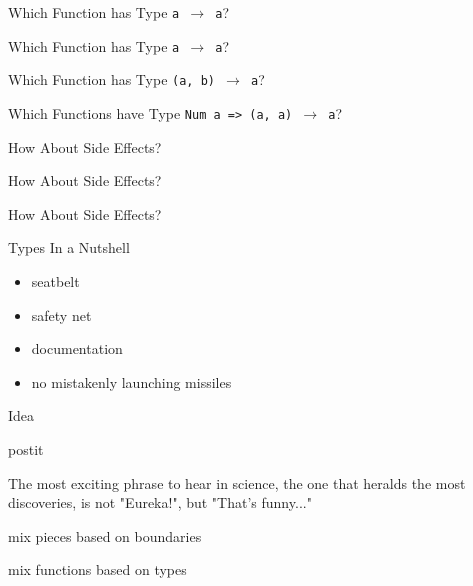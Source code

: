 \documentclass{beamer}
\renewcommand\quote[3]{
  \begin{beamercolorbox}[wd=\textwidth,rounded=true,shadow=true]{postit}
    #3
    \vskip5mm
    \hspace*\fill{\small{#1, \textit{#2}}}
  \end{beamercolorbox}
}
\begin{document}
\begin{frame}{Which Function has Type \texttt{a $\rightarrow$ a}?}
  
\end{frame}

\begin{frame}{Which Function has Type \texttt{a $\rightarrow$ a}?}
  
\end{frame}

\begin{frame}{Which Function has Type \texttt{(a, b) $\rightarrow$ a}?}
  \pause
  
\end{frame}

\begin{frame}{Which Functions have Type \texttt{Num a => (a, a) $\rightarrow$ a}?}
  \pause
  
  \pause

  
\end{frame}

\begin{frame}{How About Side Effects?}
  
\end{frame}

\begin{frame}{How About Side Effects?}
  
\end{frame}

\begin{frame}{How About Side Effects?}
  \small
  
\end{frame}

\begin{frame}{Types In a Nutshell}
  \begin{itemize}
    \item seatbelt
    \item safety net
    \item documentation
    \item no mistakenly launching missiles
  \end{itemize}
\end{frame}

\begin{frame}{Idea}
  \quote{Isaac Asimov}{-}{
    The most exciting phrase to hear in science, the one that heralds the most
    discoveries, is not "Eureka!", but "That's funny..."
  }
  \pause
  \pause
  \begin{description}[<+->]
    \item[(jigsaw) puzzle] mix pieces based on boundaries
    \item[programming...] mix functions based on types
  \end{description}
\end{frame}
\end{document}
